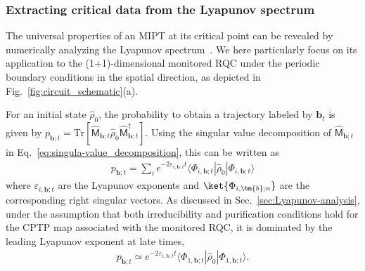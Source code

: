 \documentclass[preprint,pteplogo]{ptephy_v2}%
\numberwithin{equation}{section}
\theoremstyle{definition}
\newcommand{\mr}[1]{\mathrm{#1}}
\newcommand{\Tr}{\mr{Tr}}
\begin{document}
\subsubsection{Extracting critical data from the Lyapunov spectrum}

The universal properties of an MIPT at its critical point can be revealed by numerically analyzing the Lyapunov spectrum~\cite{zabalo2022operator, chakraborty24charge, aziz2024critical, kumar2024boundary}.
We here particularly focus on its application to the (1+1)-dimensional monitored RQC under the periodic boundary conditions in the spatial direction, as depicted in Fig.~\ref{fig:circuit_schematic}(a).

For an initial state $\hat{\rho}_0$, the probability to obtain a trajectory labeled by $\bm{b}_t$ is given by $p_{\bm{b};t} = \Tr [\hat{\mathsf{M}}_{\bm{b};t} \hat{\rho}_0 \hat{\mathsf{M}}^\dagger_{\bm{b};t}]$.
Using the singular value decomposition of $\hat{\mathsf{M}}_{\bm{b};t}$ in Eq.~\eqref{eq:singula-value_decomposition}, this can be written as 
\begin{align}
p_{\bm{b};t} = \sum_i e^{-2 \varepsilon_{i,\bm{b};t} t} \langle \Phi_{i,\bm{b};t} | \hat{\rho}_0 | \Phi_{i,\bm{b};t} \rangle
\end{align}
where $\varepsilon_{i,\bm{b};t}$ are the Lyapunov exponents and $\ket{\Phi_{i,\bm{b};n}}$ are the corresponding right singular vectors.
As discussed in Sec.~\ref{sec:Lyapunov-analysis}, under the assumption that both irreducibility and purification conditions hold for the CPTP map associated with the monitored RQC, it is dominated by the leading Lyapunov exponent at late times, 
\begin{align}
p_{\bm{b};t} \simeq e^{-2\varepsilon_{1,\bm{b};t}t} \langle \Phi_{1,\bm{b};t} | \hat{\rho}_0 | \Phi_{1,\bm{b};t} \rangle.
\end{align}
\end{document}
